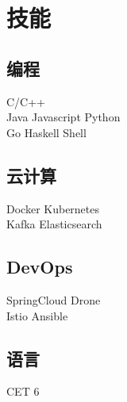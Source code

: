 \documentclass[]{deedy-resume-openfont}
\begin{document}
\begin{minipage}[t]{0.3\textwidth}

\section{技能}
\sectionsep
\subsection{\textbf{编程}}
C/C++ \\
Java \textbullet{} Javascript \textbullet{} Python \ \\
Go \textbullet{} Haskell \textbullet{} Shell  \\ 
\sectionsep

\subsection{\textbf{云计算}}
Docker \textbullet{} Kubernetes \\
Kafka \textbullet{} Elasticsearch \\
\sectionsep

\subsection{\textbf{DevOps}}
SpringCloud \textbullet Drone \\
Istio \textbullet Ansible \\
\sectionsep

\subsection{\textbf{语言}}
CET 6   \\
\sectionsep

%
%

\end{minipage} 
\hfill
\end{document}
